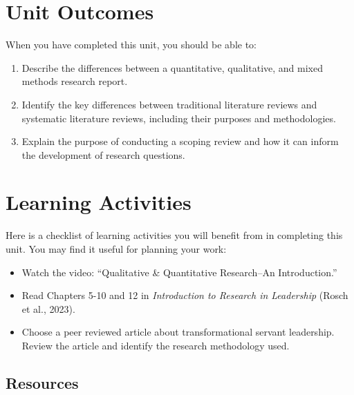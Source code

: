 \documentclass[
  letterpaper,
  DIV=11,
  numbers=noendperiod]{scrreprt}
\providecommand{\tightlist}{%
  \setlength{\itemsep}{0pt}\setlength{\parskip}{0pt}}\usepackage{longtable,booktabs,array}
\begin{document}
\section*{Unit Outcomes}\label{unit-outcomes-1}


When you have completed this unit, you should be able to:

\begin{enumerate}
\def\labelenumi{\arabic{enumi}.}
\tightlist
\item
  Describe the differences between a quantitative, qualitative, and
  mixed methods research report.
\item
  Identify the key differences between traditional literature reviews
  and systematic literature reviews, including their purposes and
  methodologies.
\item
  Explain the purpose of conducting a scoping review and how it can
  inform the development of research questions.
\end{enumerate}

\section*{Learning Activities}\label{learning-activities-1}


Here is a checklist of learning activities you will benefit from in
completing this unit. You may find it useful for planning your work:

\begin{itemize}
\tightlist
\item
  Watch the video: ``Qualitative \& Quantitative Research--An
  Introduction.''
\item
  Read Chapters 5-10 and 12 in \emph{Introduction to Research in
  Leadership} (Rosch et al., 2023).
\item
  Choose a peer reviewed article about transformational servant
  leadership. Review the article and identify the research methodology
  used.
\end{itemize}

\subsection*{Resources}\label{resources-1}
\end{document}
